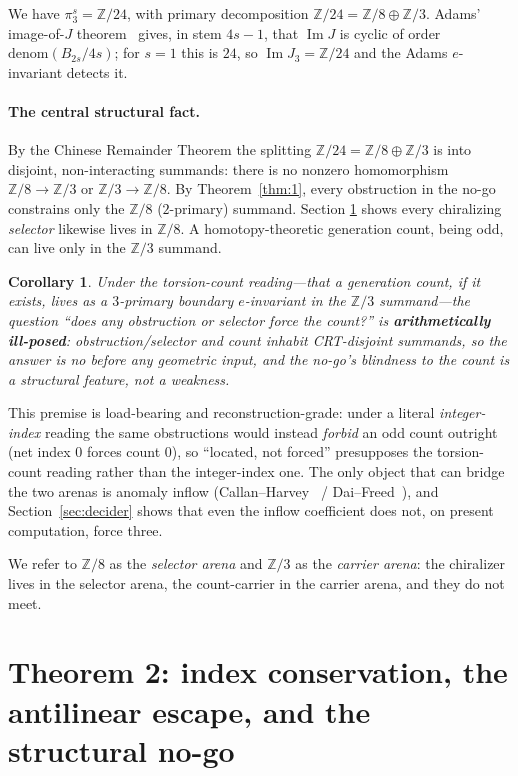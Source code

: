 \documentclass[11pt]{article}
\newtheorem{corollary}{Corollary}
\theoremstyle{definition}
\theoremstyle{remark}
\newcommand{\Z}{\mathbb{Z}}
\newcommand{\pis}{\pi_3^{s}}
\newcommand{\Imm}{\operatorname{Im}}
\begin{document}
We have $\pis = \Z/24$, with primary decomposition $\Z/24 = \Z/8 \oplus \Z/3$. Adams' image-of-$J$ theorem~\cite{adams1966jx4}
gives, in stem $4s-1$, that $\Imm J$ is cyclic of order $\mathrm{denom}(B_{2s}/4s)$; for $s=1$ this is $24$, so
$\Imm J_3 = \Z/24$ and the Adams $e$-invariant detects it.

\paragraph{The central structural fact.} By the Chinese Remainder Theorem the splitting $\Z/24 = \Z/8\oplus\Z/3$
is into disjoint, non-interacting summands: there is no nonzero homomorphism $\Z/8\to\Z/3$ or $\Z/3\to\Z/8$. By
Theorem~\ref{thm:1}, every obstruction in the no-go constrains only the $\Z/8$ ($2$-primary) summand. Section
\ref{sec:thm2} shows every chiralizing \emph{selector} likewise lives in $\Z/8$. A homotopy-theoretic generation
count, being odd, can live only in the $\Z/3$ summand.

\begin{corollary}\label{cor:arenas}
\emph{Under the torsion-count reading}---that a generation count, if it exists, lives as a $3$-primary boundary
$e$-invariant in the $\Z/3$ summand---the question ``does any obstruction or selector force the count?'' is
\textbf{arithmetically ill-posed}: obstruction/selector and count inhabit CRT-disjoint summands, so the answer is
no before any geometric input, and the no-go's blindness to the count is a structural feature, not a weakness.
\end{corollary}

This premise is load-bearing and reconstruction-grade: under a literal \emph{integer-index} reading the same
obstructions would instead \emph{forbid} an odd count outright (net index $0$ forces count $0$), so ``located,
not forced'' presupposes the torsion-count reading rather than the integer-index one. The only object that can
bridge the two arenas is anomaly inflow (Callan--Harvey~\cite{callan1985anomalies} /
Dai--Freed~\cite{dai1994eta}), and Section~\ref{sec:decider} shows that
even the inflow coefficient does not, on present computation, force three.

We refer to $\Z/8$ as the \emph{selector arena} and $\Z/3$ as the \emph{carrier arena}: the chiralizer lives in
the selector arena, the count-carrier in the carrier arena, and they do not meet.

\section{Theorem 2: index conservation, the antilinear escape, and the structural no-go}\label{sec:thm2}
\end{document}
